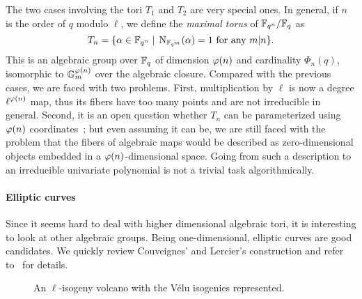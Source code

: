 \documentclass{sig-alternate}
\begin{document}
The two cases involving the tori $T_1$ and $T_2$ are very special
ones. In general, if $n$ is the order of $q$ modulo $\ell$, we define
the \emph{maximal torus} of $\mathbb{F}_{q^n}/\mathbb{F}_q$ as
\begin{equation}
  T_n = \{\alpha\in\mathbb{F}_{q^n} \;|\; \operatorname{N}_{\mathbb{F}_{q^m}}(\alpha) = 1 
  \text{ for any $m|n$} \}.
\end{equation}
This is an algebraic group over $\mathbb{F}_q$ of dimension $\varphi(n)$ and
cardinality $\Phi_n(q)$, isomorphic to $\mathbb{G}_m^{\varphi(n)}$ over
the algebraic closure. Compared with the previous cases, we are faced
with two problems. First, multiplication by $\ell$ is now a degree
$\ell^{\varphi(n)}$ map, thus its fibers have too many points and are
not irreducible in general. Second, it is an open question whether
$T_n$ can be parameterized using $\varphi(n)$
coordinates~\cite{rubin-silverberg+crypto03,rubin+silverberg03,voskresenskii98};
but even assuming it can be, we are still faced with the problem that
the fibers of algebraic maps would be described as zero-dimensional
objects embedded in a $\varphi(n)$-dimensional space. Going from such a
description to an irreducible univariate polynomial is not a trivial
task algorithmically.

\paragraph{Elliptic curves}
Since it seems hard to deal with higher dimensional algebraic tori, it
is interesting to look at other algebraic groups. Being
one-dimensional, elliptic curves are good candidates. We quickly
review Couveignes' and Lercier's construction and refer
to~\cite{couveignes+lercier11} for details.

\begin{figure}
  \centering
  \caption{An $\ell$-isogeny volcano with the Vélu isogenies
    represented.}
  \label{fig:volcano}
\end{figure}
\end{document}
